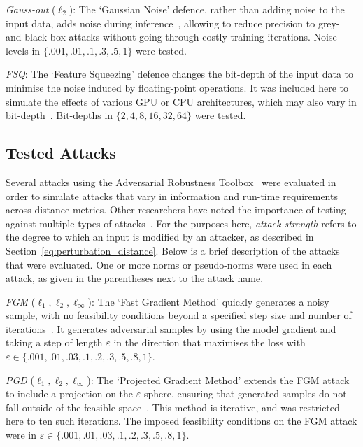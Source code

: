 \textit{Gauss-out} ($\ell_2$): The `Gaussian Noise' defence, rather than adding noise to the input data, adds noise during inference~\cite{gauss_out}, allowing to reduce precision to grey- and black-box attacks without going through costly training iterations.
Noise levels in $\{.001, .01, .1, .3, .5, 1\}$ were tested.


\textit{FSQ}: The `Feature Squeezing' defence changes the bit-depth of the input data to minimise the noise induced by floating-point operations.
It was included here to simulate the effects of various GPU or CPU architectures, which may also vary in bit-depth~\cite{feature_squeezing}.
Bit-depths in $\{2, 4, 8, 16, 32, 64\}$ were tested.



\subsection{Tested Attacks}
\label{attacks}

Several attacks using the Adversarial Robustness Toolbox~\cite{art2018} were evaluated in order to simulate attacks that vary in information and run-time requirements across distance metrics.
Other researchers have noted the importance of testing against multiple types of attacks~\cite{carlini_towards_2017}.
For the purposes here, \textit{attack strength} refers to the degree to which an input is modified by an attacker, as described in Section~\ref{eq:perturbation_distance}.
Below is a brief description of the attacks that were evaluated.
One or more norms or pseudo-norms were used in each attack, as given in the parentheses next to the attack name.


\textit{FGM} ($\ell_1, \ell_2, \ell_{\infty}$): The `Fast Gradient Method' quickly generates a noisy sample, with no feasibility conditions beyond a specified step size and number of iterations~\cite{fgm}.
It generates adversarial samples by using the model gradient and taking a step of length $\varepsilon$ in the direction that maximises the loss with $\varepsilon \in \{.001,.01,.03,.1,.2,.3,.5,.8,1\}$.


\textit{PGD}  ($\ell_1, \ell_2, \ell_{\infty}$): The `Projected Gradient Method' extends the FGM attack to include a projection on the $\varepsilon$-sphere, ensuring that generated samples do not fall outside of the feasible space~\cite{madry2017towards}.
This method is iterative, and was restricted here to ten such iterations. The imposed feasibility conditions on the FGM attack were in $\varepsilon \in \{.001,.01,.03,.1,.2,.3,.5,.8,1\}$.


